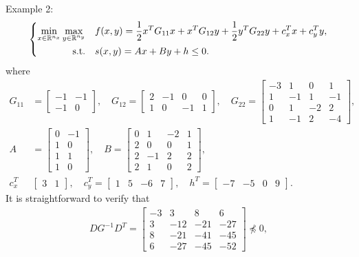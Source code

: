 \documentclass{article}
\begin{document}
	
	Example 2:
	\begin{align}
		\left\lbrace
		\begin{aligned}
			\min_{x\in\mathbb{R}^{n_{x}}}\max_{y\in\mathbb{R}^{n_{y}}}\quad& f(x, y) = \frac{1}{2}x^{T}G_{11}x + x^{T}G_{12}y + \frac{1}{2}y^{T}G_{22}y + c_{x}^{T}x + c_{y}^{T}y,\\
			{\rm s.t.}\quad & s(x, y) = Ax + By + h \leq 0.
		\end{aligned}\right.
	\end{align}
	where
	\begin{align*}
		G_{11} & = \begin{bmatrix}
			-1 & -1\\
			-1 & 0
		\end{bmatrix}, \quad G_{12} = \begin{bmatrix}
			2 &	-1 & 0 & 0\\
			1 &	0 &	-1 & 1
		\end{bmatrix}, \quad G_{22} = \begin{bmatrix}
			-3 & 1 & 0 & 1\\
			1 & -1 & 1 & -1\\
			0 & 1 & -2 & 2\\
			1 & -1 & 2 & -4
		\end{bmatrix},\\
		A & = \begin{bmatrix}
			0 & -1\\
			1 & 0\\
			1 & 1\\
			1 & 0
		\end{bmatrix},\quad B = \begin{bmatrix}
			0 & 1 & -2 & 1\\
			2 & 0 & 0 & 1\\
			2 & -1 & 2 & 2\\
			2 & 1 & 0 & 2
		\end{bmatrix},\\
		c_{x}^{T} & \begin{bmatrix}
			3 & 1
		\end{bmatrix}, \quad c_{y}^{T} = \begin{bmatrix}
			1 & 5 & -6 & 7
		\end{bmatrix},\quad h^{T} = \begin{bmatrix}
			-7 & -5 & 0 & 9
		\end{bmatrix}.
	\end{align*}
	It is straightforward to verify that
	\begin{align*}
		DG^{-1}D^{T} =
		\begin{bmatrix}
			-3 & 3 & 8 & 6\\
			3 & -12 & -21 & -27\\
			8 & -21 & -41 & -45\\
			6 & -27 & -45 & -52
		\end{bmatrix} \npreceq 0,
	\end{align*}
\end{document}
